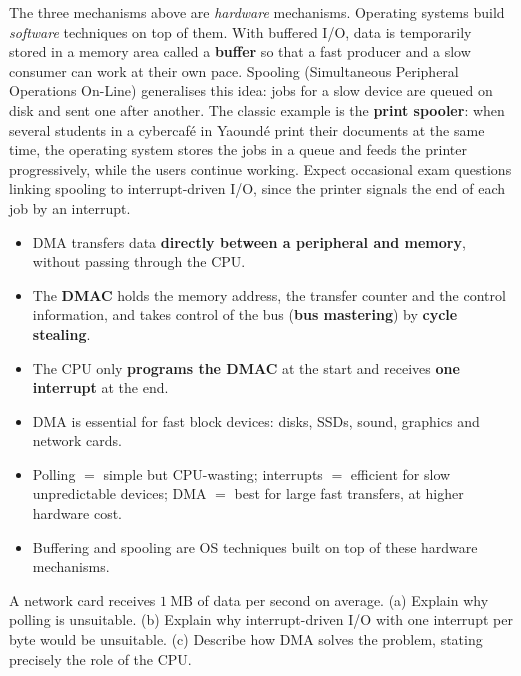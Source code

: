 \documentclass[11pt]{article}
\newcommand{\cle}[1]{{\popxbold\color{popdark}#1}}
\newcounter{popsec}
\newcounter{popsub}
\newcommand{\courssub}[1]{%
  \stepcounter{popsub}%
  \par\vspace{9pt}\noindent{\popxbold\fontsize{11.5}{13}\selectfont\color{popink}{\color{poporange}\thepopsec.\thepopsub}\hspace{6pt}#1}\par\nopagebreak\vspace{4pt}
}
\begin{document}
\courssub{Exam Extra: Buffered I/O and Spooling}

\begin{savaistu}
The three mechanisms above are \emph{hardware} mechanisms. Operating systems build \emph{software} techniques on top of them. With \cle{buffered I/O}, data is temporarily stored in a memory area called a \textbf{buffer} so that a fast producer and a slow consumer can work at their own pace. \cle{Spooling} (Simultaneous Peripheral Operations On-Line) generalises this idea: jobs for a slow device are queued on disk and sent one after another. The classic example is the \textbf{print spooler}: when several students in a cybercaf\'e in Yaound\'e print their documents at the same time, the operating system stores the jobs in a queue and feeds the printer progressively, while the users continue working. Expect occasional exam questions linking spooling to interrupt-driven I/O, since the printer signals the end of each job by an interrupt.
\end{savaistu}

\begin{aretenir}
\begin{itemize}
\item DMA transfers data \textbf{directly between a peripheral and memory}, without passing through the CPU.
\item The \textbf{DMAC} holds the memory address, the transfer counter and the control information, and takes control of the bus (\textbf{bus mastering}) by \textbf{cycle stealing}.
\item The CPU only \textbf{programs the DMAC} at the start and receives \textbf{one interrupt} at the end.
\item DMA is essential for fast block devices: disks, SSDs, sound, graphics and network cards.
\item Polling $=$ simple but CPU-wasting; interrupts $=$ efficient for slow unpredictable devices; DMA $=$ best for large fast transfers, at higher hardware cost.
\item Buffering and spooling are OS techniques built on top of these hardware mechanisms.
\end{itemize}
\end{aretenir}

\begin{exercice}
A network card receives $1\ \mathrm{MB}$ of data per second on average. (a) Explain why polling is unsuitable. (b) Explain why interrupt-driven I/O with one interrupt per byte would be unsuitable. (c) Describe how DMA solves the problem, stating precisely the role of the CPU.
\end{exercice}
\end{document}
